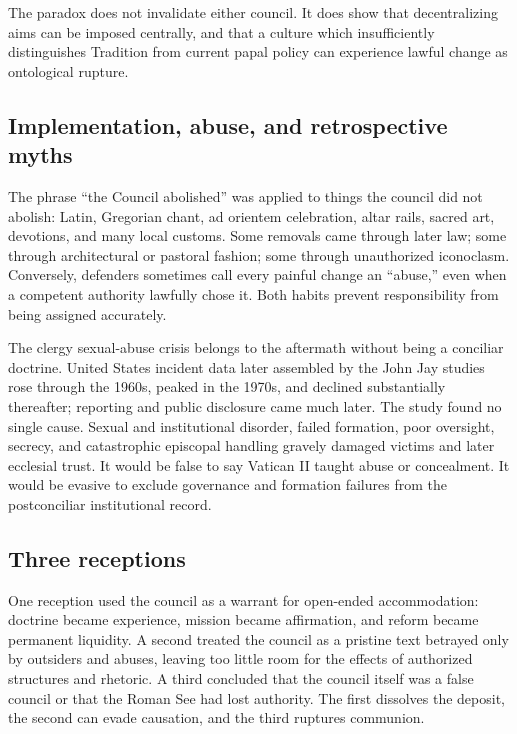 The paradox does not invalidate either council. It does show that decentralizing aims can be imposed centrally, and that a culture which insufficiently distinguishes Tradition from current papal policy can experience lawful change as ontological rupture.

\subsection{Implementation, abuse, and retrospective myths}

The phrase “the Council abolished” was applied to things the council did not abolish: Latin, Gregorian chant, ad orientem celebration, altar rails, sacred art, devotions, and many local customs. Some removals came through later law; some through architectural or pastoral fashion; some through unauthorized iconoclasm. Conversely, defenders sometimes call every painful change an “abuse,” even when a competent authority lawfully chose it. Both habits prevent responsibility from being assigned accurately.

The clergy sexual-abuse crisis belongs to the aftermath without being a conciliar doctrine. United States incident data later assembled by the John Jay studies rose through the 1960s, peaked in the 1970s, and declined substantially thereafter; reporting and public disclosure came much later. The study found no single cause. Sexual and institutional disorder, failed formation, poor oversight, secrecy, and catastrophic episcopal handling gravely damaged victims and later ecclesial trust. It would be false to say Vatican II taught abuse or concealment. It would be evasive to exclude governance and formation failures from the postconciliar institutional record.

\subsection{Three receptions}

One reception used the council as a warrant for open-ended accommodation: doctrine became experience, mission became affirmation, and reform became permanent liquidity. A second treated the council as a pristine text betrayed only by outsiders and abuses, leaving too little room for the effects of authorized structures and rhetoric. A third concluded that the council itself was a false council or that the Roman See had lost authority. The first dissolves the deposit, the second can evade causation, and the third ruptures communion.


